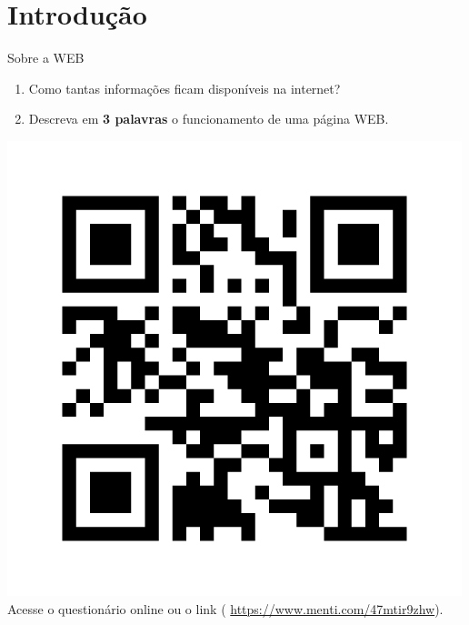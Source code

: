 \documentclass{beamer}
\begin{document}
\section{Introdução}
\begin{frame}{Sobre a WEB}
  \begin{enumerate}
    \item Como tantas informações ficam disponíveis na internet?
    \item Descreva em \textbf{3 palavras} o funcionamento de uma página WEB.
  \end{enumerate}
  \begin{center}
\includegraphics[height=0.5\paperheight]{fig/aula1/mentimeter_profcostasilvati_qr_code.png} \\
    		Acesse o questionário online ou o link ( \href{https://www.menti.com/47mtir9zhw}{https://www.menti.com/47mtir9zhw}).
		\end{center}
\end{frame}
\end{document}
